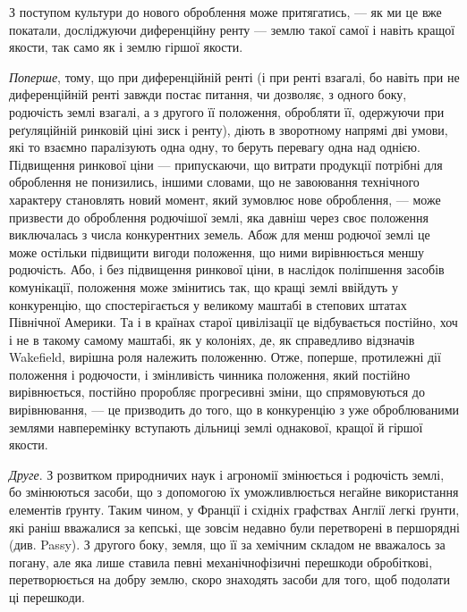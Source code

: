 
З поступом культури до нового оброблення може притягатись, — як ми це
вже покатали, досліджуючи диференційну ренту — землю такої самої і навіть
кращої якости, так само як і землю гіршої якости.

\emph{Поперше}, тому, що при диференційній ренті (і при ренті взагалі, бо
навіть при не диференційній ренті завжди постає питання, чи дозволяє, з одного
боку, родючість землі взагалі, а з другого її положення, обробляти її,
одержуючи при реґуляційній ринковій ціні зиск і ренту), діють в зворотному
напрямі дві умови, які то взаємно паралізують одна одну, то беруть
перевагу одна над однією. Підвищення ринкової ціни — припускаючи, що витрати
продукції потрібні для оброблення не понизились, іншими словами, що
не завоювання технічного характеру становлять новий момент, який зумовлює
нове оброблення, — може призвести до оброблення родючішої землі, яка давніш
через своє положення виключалась з числа конкурентних земель. Абож для
менш родючої землі це може остільки підвищити вигоди положення, що ними
вирівнюється меншу родючість. Або, і без підвищення ринкової ціни, в наслідок
поліпшення засобів комунікації, положення може змінитись так, що кращі землі
ввійдуть у конкуренцію, що спостерігається у великому маштабі в степових
штатах Північної Америки. Та і в країнах старої цивілізації це відбувається
постійно, хоч і не в такому самому маштабі, як у колоніях, де, як справедливо
відзначів Wakefield, вирішна роля належить положенню. Отже, поперше,
протилежні дії положення і родючости, і змінливість чинника положення, який
постійно вирівнюється, постійно проробляє прогресивні зміни, що спрямовуються
до вирівнювання, — це призводить до того, що в конкуренцію з уже оброблюваними
землями навперемінку вступають дільниці землі однакової, кращої й
гіршої якости.

\emph{Друге}. З розвитком природничих наук і агрономії змінюється і родючість
землі, бо змінюються засоби, що з допомогою їх уможливлюється негайне
використання елементів ґрунту. Таким чином, у Франції і східніх графствах
Англії легкі ґрунти, які раніш вважалися за кепські, ще зовсім недавно були
перетворені в першорядні (див. Passy). З другого боку, земля, що її за хемічним
складом не вважалось за погану, але яка лише ставила певні механічнофізичні
перешкоди обробіткові, перетворюється на добру землю, скоро знаходять
засоби для того, щоб подолати ці перешкоди.

